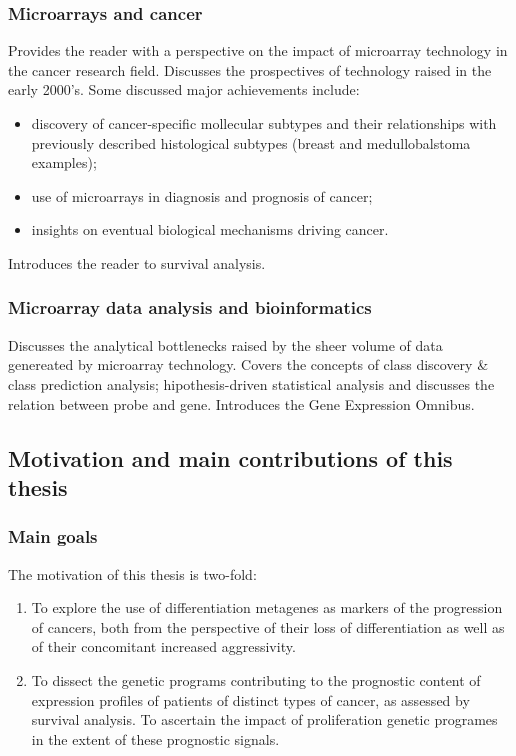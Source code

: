 \documentclass[11pt]{article}
\begin{document}
\subsubsection{Microarrays and cancer}
\label{sec-1-3-2}
Provides the reader with a perspective on the impact of microarray technology in
the cancer research field. Discusses the prospectives of technology
raised in the early 2000's. Some discussed major achievements include:
\begin{itemize}
\item discovery of cancer-specific mollecular subtypes and their relationships with
previously described histological subtypes (breast and medullobalstoma
examples);
\item use of microarrays in diagnosis and prognosis of cancer;
\item insights on eventual biological mechanisms driving cancer.
\end{itemize}

Introduces the reader to survival analysis.

\subsubsection{Microarray data analysis and bioinformatics}
\label{sec-1-3-3}
Discusses the analytical bottlenecks raised by the sheer volume of data
genereated by microarray technology. Covers the concepts of class discovery \&
class prediction analysis; hipothesis-driven statistical analysis and discusses
the relation between probe and gene. Introduces the Gene Expression Omnibus.

\subsection{Motivation and main contributions of this thesis}
\label{sec-1-4}
\subsubsection{Main goals}
\label{sec-1-4-1}
The motivation of this thesis is two-fold:
\begin{enumerate}
\item To explore the use of differentiation metagenes as markers of the progression
of cancers, both from the perspective of their loss of differentiation as
well as of their concomitant increased aggressivity.
\item To dissect the genetic programs contributing to the prognostic content of
expression profiles of patients of distinct types of cancer, as assessed by
survival analysis. To ascertain the impact of proliferation genetic programes
in the extent of these prognostic signals.
\end{enumerate}
\end{document}
